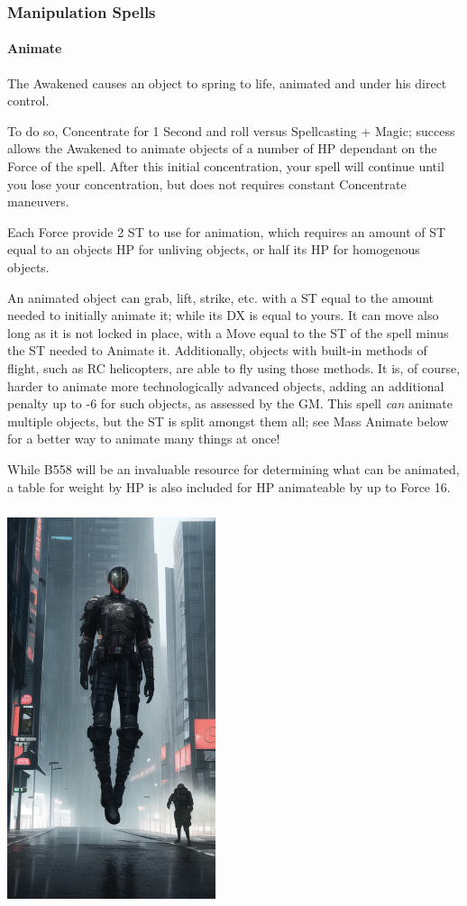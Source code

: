\begin{multicols*}{3}
	\subsubsection{Manipulation Spells}
	
	\paragraph{Animate}
	
	The Awakened causes an object to spring to life, animated and under his direct control.
	
	To do so, Concentrate for 1 Second and roll versus Spellcasting + Magic; success allows the Awakened to animate objects of a number of HP dependant on the Force of the spell. After this initial concentration, your spell will continue until you lose your concentration, but does not requires constant Concentrate maneuvers.
	
	Each Force provide 2 ST to use for animation, which requires an amount of ST equal to an objects HP for unliving objects, or half its HP for homogenous objects.
	
	An animated object can grab, lift, strike, etc. with a ST equal to the amount needed to initially animate it; while its DX is equal to yours. It can move also long as it is not locked in place, with a Move equal to the ST of the spell minus the ST needed to Animate it. Additionally, objects with built-in methods of flight, such as RC helicopters, are able to fly using those methods. It is, of course, harder to animate more technologically advanced objects, adding an additional penalty up to -6 for such objects, as assessed by the GM. This spell \textit{can} animate multiple objects, but the ST is split amongst them all; see Mass Animate below for a better way to animate many things at once!
	
	While B558 will be an invaluable resource for determining what can be animated, a table for weight by HP is also included for HP animateable by up to Force 16.	
	
	\includegraphics*[width=6.1cm, height=11.7cm]{levitate.png}
	

\end{multicols*}
